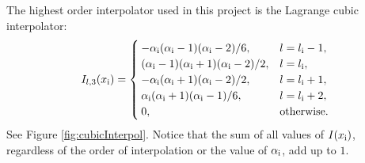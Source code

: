 The highest order interpolator used in this project is the Lagrange cubic interpolator: 
\begin{equation}\label{eq:cubicI}
    I_{l,3}(x_{\text{i}}) = \begin{cases}
        -\alpha_{\text{i}} (\alpha_{\text{i}}-1)(\alpha_{\text{i}}-2)/6, & l = l_{\text{i}}-1,\\
        (\alpha_{\text{i}}-1)(\alpha_{\text{i}}+1)(\alpha_{\text{i}}-2)/2,  & l = l_{\text{i}},\\
        -\alpha_{\text{i}} (\alpha_{\text{i}}+1)(\alpha_{\text{i}}-2)/2, & l = l_{\text{i}} + 1,\\
        \alpha_{\text{i}} (\alpha_{\text{i}}+1)(\alpha_{\text{i}}-1)/6, & l = l_{\text{i}} + 2,\\
        0, & \text{otherwise.}
    \end{cases}
\end{equation}
See Figure \ref{fig:cubicInterpol}. 
Notice that the sum of all values of $I(x_{\text{i}})$, regardless of the order of interpolation or the value of $\alpha_{\text{i}}$, add up to $1$.

